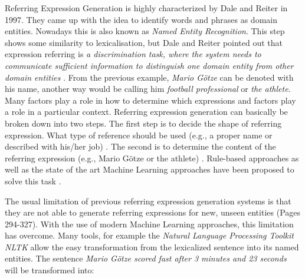 Referring Expression Generation is highly characterized by Dale and Reiter in 1997. They came up with the idea to identify words and phrases as domain entities. Nowadays this is also known as \textit{Named Entity Recognition}. This step shows some similarity to lexicalisation, but Dale and Reiter pointed out that expression referring is \textit{a discrimination task, where the system needs to communicate sufficient information to distinguish one domain entity from other domain entities} \cite{reiter2}. From the previous example, \textit{Mario Götze} can be denoted with his name, another way would be calling him \textit{football professional} or \textit{the athlete}. Many factors play a role in how to determine which expressions and factors play a role in a particular context. Referring expression generation can basically be broken down into two steps.
The first step is to decide the shape of referring expression. What type of reference should be used (e.g., a proper name or described with his/her job) \cite{named}. The second is to determine the content of the referring expression (e.g., Mario Götze or the athlete) \cite{named}.
Rule-based approaches as well as the state of the art Machine Learning approaches have been proposed to solve this task \cite{reiter2}.  

The usual limitation of previous referring expression generation systems is that they are not able to generate referring expressions for new, unseen entities \cite{anja} (Pages 294-327). With the use of modern Machine Learning approaches, this limitation has overcome.
Many tools, for example the \textit{Natural Language Processing Toolkit NLTK} allow the easy transformation from the lexicalized sentence into its named entities. The sentence \textit{Mario Götze scored fast after 3 minutes and 23 seconds} will be transformed into:

